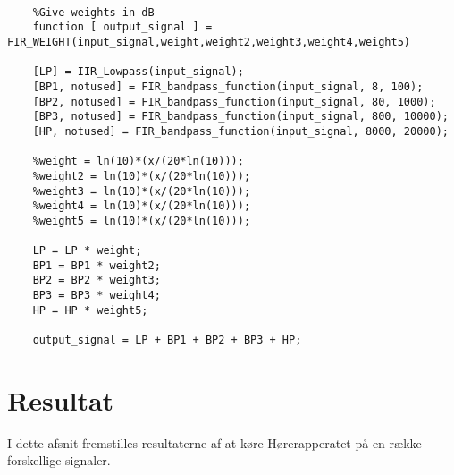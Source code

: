 \begin{verbatim}
	
	%Give weights in dB
	function [ output_signal ] = FIR_WEIGHT(input_signal,weight,weight2,weight3,weight4,weight5)
	
	[LP] = IIR_Lowpass(input_signal);
	[BP1, notused] = FIR_bandpass_function(input_signal, 8, 100);
	[BP2, notused] = FIR_bandpass_function(input_signal, 80, 1000);
	[BP3, notused] = FIR_bandpass_function(input_signal, 800, 10000);
	[HP, notused] = FIR_bandpass_function(input_signal, 8000, 20000);
	
	%weight = ln(10)*(x/(20*ln(10)));
	%weight2 = ln(10)*(x/(20*ln(10)));
	%weight3 = ln(10)*(x/(20*ln(10)));
	%weight4 = ln(10)*(x/(20*ln(10)));
	%weight5 = ln(10)*(x/(20*ln(10)));
	
	LP = LP * weight;
	BP1 = BP1 * weight2;
	BP2 = BP2 * weight3;
	BP3 = BP3 * weight4;
	HP = HP * weight5;
	
	output_signal = LP + BP1 + BP2 + BP3 + HP;
\end{verbatim}

\section{Resultat}
I dette afsnit fremstilles resultaterne af at køre Hørerapperatet på en række forskellige signaler.

